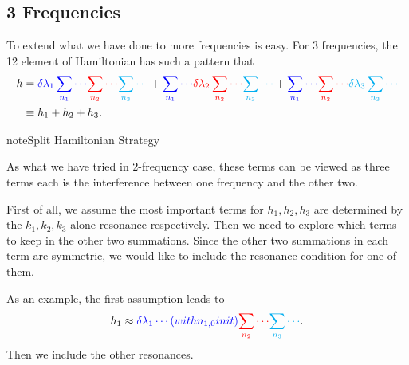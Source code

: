 \documentclass[letterpaper,12pt,english]{sphinxmanual}
\begin{document}
\subsection{3 Frequencies}
\label{\detokenize{matter-stimulated/multi-frequency:frequencies}}
To extend what we have done to more frequencies is easy. For 3 frequencies, the 12 element of Hamiltonian has such a pattern that
\begin{equation*}
\begin{split}h &= {\color{blue} \delta \lambda_1 \sum_{n_1} \cdots } {\color{red} \sum_{n_2} \cdots } {\color{cyan}\sum_{n_3} \cdots } + {\color{blue}\sum_{n_1} \cdots } {\color{red} \delta \lambda_2 \sum_{n_2} \cdots } {\color{cyan}\sum_{n_3} \cdots } + {\color{blue}\sum_{n_1} \cdots } {\color{red}  \sum_{n_2} \cdots } {\color{cyan} \delta \lambda_3 \sum_{n_3} \cdots } \\
& \equiv h_1 + h_2 + h_3.\end{split}
\end{equation*}
\begin{sphinxadmonition}{note}{Split Hamiltonian Strategy}

As what we have tried in 2-frequency case, these terms can be viewed as three terms each is the interference between one frequency and the other two.

First of all, we assume the most important terms for \(h_1,h_2,h_3\) are determined by the \(k_1,k_2,k_3\) alone resonance respectively. Then we need to explore which terms to keep in the other two summations. Since the other two summations in each term are symmetric, we would like to include the resonance condition for one of them.

As an example, the first assumption leads to
\begin{equation*}
\begin{split}h_1 \approx {\color{blue} \delta \lambda_1 \cdots(with n_{1,0} in it) } {\color{red} \sum_{n_2} \cdots } {\color{cyan}\sum_{n_3} \cdots }.\end{split}
\end{equation*}
Then we include the other resonances.

\end{sphinxadmonition}
\end{document}
